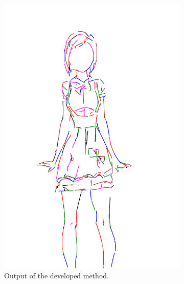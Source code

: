 \begin{figure}[h]
\begin{subfigure}{.3\textwidth}
    \includegraphics[width=\textwidth]{graphics/outputs/marked/order/sketchbench-black_Art_freeform_AG_03_Branislav Mirkovic_norm_cleaned.pdf}
    \caption{Output of the developed method.}
    \end{subfigure}
    \begin{subfigure}{.3\textwidth}

\end{subfigure}
\end{figure}
